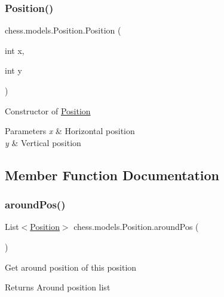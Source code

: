 \subsubsection{\texorpdfstring{Position()}{Position()}\hspace{0.1cm}{\footnotesize\ttfamily [2/2]}}
{\footnotesize\ttfamily chess.\+models.\+Position.\+Position (\begin{DoxyParamCaption}\item[{int}]{x,  }\item[{int}]{y }\end{DoxyParamCaption})}

Constructor of \mbox{\hyperlink{classchess_1_1models_1_1_position}{Position}}


\begin{DoxyParams}{Parameters}
{\em x} & Horizontal position \\
\hline
{\em y} & Vertical position \\
\hline
\end{DoxyParams}


\subsection{Member Function Documentation}
\mbox{\label{classchess_1_1models_1_1_position_a86f1df8c1f1a5303a0bb0386c5181eef}} 
\subsubsection{\texorpdfstring{around\+Pos()}{aroundPos()}}
{\footnotesize\ttfamily List$<$\mbox{\hyperlink{classchess_1_1models_1_1_position}{Position}}$>$ chess.\+models.\+Position.\+around\+Pos (\begin{DoxyParamCaption}{ }\end{DoxyParamCaption})}

Get around position of this position

\begin{DoxyReturn}{Returns}
Around position list 
\end{DoxyReturn}
\mbox{\label{classchess_1_1models_1_1_position_ad2ac6e3457056ccba6f1ccf3603f2554}} 
